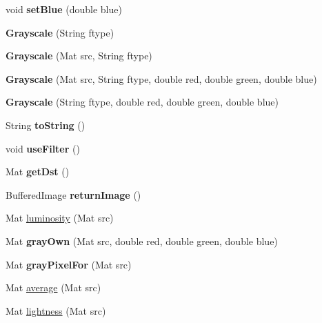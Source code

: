 \begin{DoxyCompactItemize}
void {\bfseries set\+Blue} (double blue)
\item 
\mbox{\label{classapplication_1_1_grayscale_a7740665df9dc7e57831cef051083dc75}} 
{\bfseries Grayscale} (String ftype)
\item 
\mbox{\label{classapplication_1_1_grayscale_aa8dea7d5ffdeff531e1516e4d0d65de3}} 
{\bfseries Grayscale} (Mat src, String ftype)
\item 
\mbox{\label{classapplication_1_1_grayscale_abba373fa254a7f7b3f84827bb02d93ce}} 
{\bfseries Grayscale} (Mat src, String ftype, double red, double green, double blue)
\item 
\mbox{\label{classapplication_1_1_grayscale_acda1bc0408d9279bdd9db224592903a0}} 
{\bfseries Grayscale} (String ftype, double red, double green, double blue)
\item 
\mbox{\label{classapplication_1_1_grayscale_ad6224f9b1cbe5be6d557d5856d8d0cec}} 
String {\bfseries to\+String} ()
\item 
\mbox{\label{classapplication_1_1_grayscale_a288486c59c884d5c602a42e875133d77}} 
void {\bfseries use\+Filter} ()
\item 
\mbox{\label{classapplication_1_1_grayscale_a54be5038cd5a7e8ea6ded6e3552ee529}} 
Mat {\bfseries get\+Dst} ()
\item 
\mbox{\label{classapplication_1_1_grayscale_a44bedc02913266c17b0ade60d0ba699d}} 
Buffered\+Image {\bfseries return\+Image} ()
\item 
Mat \mbox{\hyperlink{classapplication_1_1_grayscale_a6bf7ea7c89bcc25fa1f2ef43583a3bdb}{luminosity}} (Mat src)
\item 
\mbox{\label{classapplication_1_1_grayscale_adabbb810ac6797b8983e07a9c317c6c8}} 
Mat {\bfseries gray\+Own} (Mat src, double red, double green, double blue)
\item 
\mbox{\label{classapplication_1_1_grayscale_ad511856912b9ccf658e43171b6606d19}} 
Mat {\bfseries gray\+Pixel\+For} (Mat src)
\item 
Mat \mbox{\hyperlink{classapplication_1_1_grayscale_a3ef991beb69461c85a1c6bbf706e0605}{average}} (Mat src)
\item 
Mat \mbox{\hyperlink{classapplication_1_1_grayscale_a7b371c1462bfa33b5cf1b491cead7ba4}{lightness}} (Mat src)
\end{DoxyCompactItemize}


